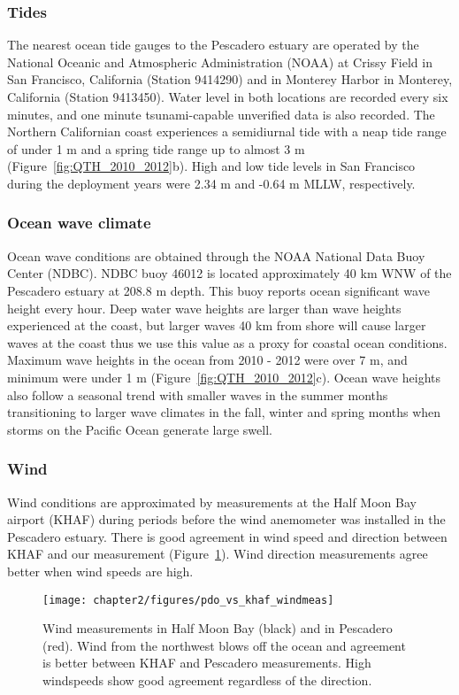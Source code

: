 \subsubsection{Tides}
The nearest ocean tide gauges to the Pescadero estuary are operated by the National Oceanic and Atmospheric Administration (NOAA) at Crissy Field in San Francisco, California (Station 9414290) and in Monterey Harbor in Monterey, California (Station 9413450). Water level in both locations are recorded every six minutes, and one minute tsunami-capable unverified data is also recorded. The Northern Californian coast experiences a semidiurnal tide with a neap tide range of under 1 m and a spring tide range up to almost 3 m (Figure~\ref{fig:QTH_2010_2012}b). High and low tide levels in San Francisco during the deployment years were 2.34 m and -0.64 m MLLW, respectively. 

\subsubsection{Ocean wave climate}
Ocean wave conditions are obtained through the NOAA National Data Buoy Center (NDBC). NDBC buoy 46012 is located approximately 40 km WNW of the Pescadero estuary at 208.8 m depth. This buoy reports ocean significant wave height every hour. Deep water wave heights are larger than wave heights experienced at the coast, but larger waves 40 km from shore will cause larger waves at the coast thus we use this value as a proxy for coastal ocean conditions. Maximum wave heights in the ocean from 2010 - 2012 were over 7 m, and minimum were under 1 m (Figure~\ref{fig:QTH_2010_2012}c). Ocean wave heights also follow a seasonal trend with smaller waves in the summer months transitioning to larger wave climates in the fall, winter and spring months when storms on the Pacific Ocean generate large swell.

\subsubsection{Wind}
Wind conditions are approximated by measurements at the Half Moon Bay airport (KHAF) during periods before the wind anemometer was installed in the Pescadero estuary.  There is good agreement in wind speed and direction between KHAF and our measurement (Figure~\ref{fig:PDOvsKHAFwind}). Wind direction measurements agree better when wind speeds are high.

\begin{figure}
\centering
	\texttt{[image: chapter2/figures/pdo\_vs\_khaf\_windmeas]} \caption{Wind measurements in Half Moon Bay (black) and in Pescadero (red). Wind from the northwest blows off the ocean and agreement is better between KHAF and Pescadero measurements. High windspeeds show good agreement regardless of the direction.} \label{fig:PDOvsKHAFwind}
\end{figure}


